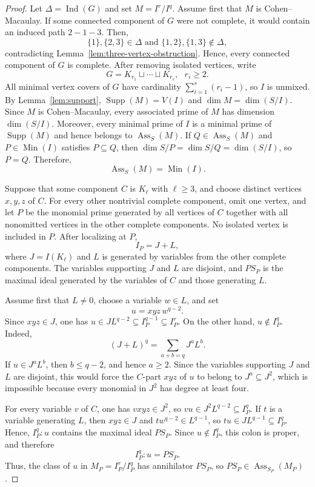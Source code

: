 \documentclass[12pt]{amsart}
\theoremstyle{plain}
\theoremstyle{definition}
\theoremstyle{remark}
\begin{document}
\begin{proof}
Let $\Delta=\operatorname{Ind}(G)$ and set $M=I^r/I^q$. Assume first that
$M$ is Cohen--Macaulay. If some connected component of $G$ were not complete,
it would contain an induced path $2-1-3$. Then,
$$
\{1\},\{2,3\}\in\Delta
\text{ and }
\{1,2\},\{1,3\}\notin\Delta,
$$
contradicting Lemma~\ref{lem:three-vertex-obstruction}. Hence, every connected
component of $G$ is complete. After removing isolated vertices, write
$$
G=K_{r_1}\sqcup\cdots\sqcup K_{r_s},\text{ } r_i\ge2.
$$
All minimal vertex covers of $G$ have cardinality
$\sum_{i=1}^s(r_i-1)$, so $I$ is unmixed. By Lemma~\ref{lem:support},
$\operatorname{Supp}(M)=V(I)$ and $\dim M=\dim(S/I)$. Since $M$ is
Cohen--Macaulay, every associated prime of $M$ has dimension $\dim(S/I)$.
Moreover, every minimal prime of $I$ is a minimal prime of
$\operatorname{Supp}(M)$ and hence belongs to $\operatorname{Ass}_S(M)$.
If $Q\in\operatorname{Ass}_S(M)$ and $P\in\operatorname{Min}(I)$ satisfies
$P\subseteq Q$, then $\dim S/P=\dim S/Q=\dim(S/I)$, so $P=Q$. Therefore,
$$
\operatorname{Ass}_S(M)=\operatorname{Min}(I).
$$

Suppose that some component $C$ is $K_\ell$ with $\ell\ge3$, and choose
distinct vertices $x,y,z$ of $C$. For every other nontrivial complete component, omit
one vertex, and let $P$ be the monomial prime generated by all vertices of
$C$ together with all nonomitted vertices in the other complete components.
No isolated vertex is included in $P$. After localizing at $P$,
$$
I_P=J+L,
$$
where $J=I(K_\ell)$ and $L$ is generated by variables from the other complete
components. The variables supporting $J$ and $L$ are disjoint, and $PS_P$ is
the maximal ideal generated by the variables of $C$ and those generating $L$.

Assume first that $L\neq0$, choose a variable $w\in L$, and set
$$
u=xyz\,w^{q-2}.
$$
Since $xyz\in J$, one has
$u\in JL^{q-2}\subseteq I_P^{q-1}\subseteq I_P^r$. On the other hand,
$u\notin I_P^q$. Indeed,
$$
(J+L)^q=\sum_{a+b=q}J^aL^b.
$$
If $u\in J^aL^b$, then $b\le q-2$, and hence $a\ge2$. Since the
variables supporting $J$ and $L$ are disjoint, this would force the $C$-part
$xyz$ of $u$ to belong to $J^a\subseteq J^2$, which is impossible because
every monomial in $J^2$ has degree at least four.

For every variable $v$ of $C$, one has $vxyz\in J^2$, so
$vu\in J^2L^{q-2}\subseteq I_P^q$. If $t$ is a variable generating $L$,
then $xyz\in J$ and $tw^{q-2}\in L^{q-1}$, so
$tu\in JL^{q-1}\subseteq I_P^q$. Hence,
$I_P^q:u$ contains the maximal ideal $PS_P$. Since $u\notin I_P^q$, this
colon is proper, and therefore
$$
I_P^q:u=PS_P.
$$
Thus, the class of $u$ in $M_P=I_P^r/I_P^q$ has annihilator $PS_P$, so
$PS_P\in\operatorname{Ass}_{S_P}(M_P)$.


\end{proof}
\end{document}
